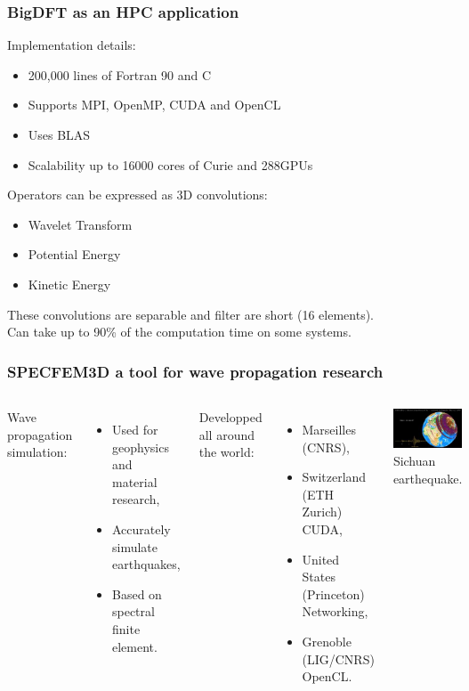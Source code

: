 \documentclass{beamer}
\begin{document}
\begin{frame}
\frametitle{BigDFT as an HPC application}
\begin{block}{Implementation details:}
\begin{itemize}
\item 200,000 lines of Fortran 90 and C
\item Supports MPI, OpenMP, CUDA and OpenCL
\item Uses BLAS
\item Scalability up to 16000 cores of Curie and 288GPUs
\end{itemize}
\end{block}

\begin{block}{Operators can be expressed as 3D convolutions:}
  \begin{itemize}
    \item Wavelet Transform
    \item Potential Energy
    \item Kinetic Energy
  \end{itemize}
  These convolutions are separable and filter are short (16 elements).\\
  Can take up to 90\% of the computation time on some systems.
\end{block}
\end{frame}

\begin{frame}
  \frametitle{SPECFEM3D a tool for wave propagation research}
\begin{columns}
\column{6cm}
Wave propagation simulation:
\begin{itemize}
  \item Used for geophysics and material research,
  \item Accurately simulate earthquakes,
  \item Based on spectral finite element.
\end{itemize}
Developped all around the world:
\begin{itemize}
\item Marseilles (CNRS),
\item Switzerland (ETH Zurich) CUDA,
\item United States (Princeton) Networking,
\item Grenoble (LIG/CNRS) OpenCL.
\end{itemize}
\column{5cm}
\centering
\includegraphics[width=5cm]{image_movie_Sichuan_009000_0.jpg}\\
Sichuan earthequake.
\end{columns}
\end{frame}
\end{document}
